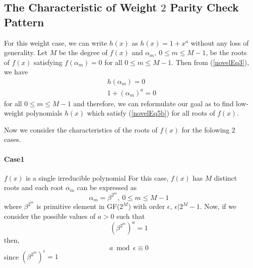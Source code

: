 \subsection{The Characteristic of Weight $2$ Parity Check Pattern}
For this weight case, we can write $h(x)$ as $h(x)=1+x^a$ without any loss of generality. 
Let $M$ be the degree of $f(x)$ and $\alpha_m, ~0 \leq m \leq M-1$, be the roots of $f(x)$ satisfying $f(\alpha_m) = 0$ for all $0 \leq m \leq M-1$. Then from (\ref{novelEq3}), we have
\begin{equation}
\begin{split}
&h(\alpha_m)=0\\
&1+(\alpha_m)^a =0
\end{split}
\label{novelEq5b}
\end{equation}
for all $0 \leq m \leq M-1$ and therefore, we can reformulate our goal as to find low-weight polynomials $h(x)$ which satisfy (\ref{novelEq5b}) for all roots of $f(x)$. 

Now we consider the characteristics of the roots of $f(x)$ for the folowing 2 cases.
\paragraph{ Case1} $f(x)$ is a single irreducible polynomial\newline
For this case, $f(x)$ has $M$ distinct roots and each root $\alpha_m$ can be expressed as
\begin{equation}
\alpha_m=\beta^{2^m},~ 0\leq m \leq M-1
\end{equation}
where $\beta^{2^m}$ is primitive element in GF($2^M$) with order $\epsilon,~\epsilon | 2^M-1$. 
Now, if we consider the possible values of $a>0$ such that 
$$(\beta^{2^m})^a=1$$
then,
$$a \bmod \epsilon  \equiv 0$$
since $(\beta^{2^m})^{\epsilon}=1$

